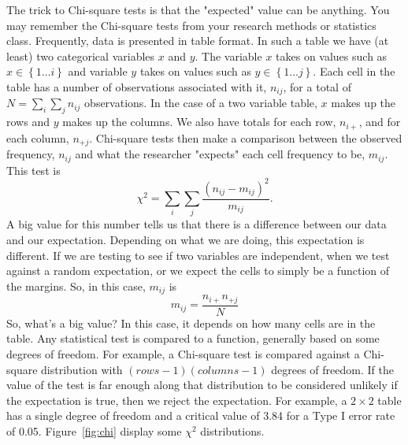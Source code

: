 The trick to Chi-square tests is that the "expected" value can be anything. You may remember the Chi-square tests from your research methods or statistics class. Frequently, data is presented in table format. In such a table we have (at least) two categorical variables $x$ and $y$. The variable $x$ takes on values such as $x\in\left\{1 \ldots i\right\}$ and variable $y$ takes on values such as $y\in\left\{1 \ldots j\right\}$. Each cell in the table has a number of observations associated with it, $n_{ij}$, for a total of $N=\sum_i\sum_jn_{ij}$ observations. In the case of a two variable table, $x$ makes up the rows and $y$ makes up the columns. We also have totals for each row, $n_{i+}$, and for each column, $n_{+j}$. Chi-square tests then make a comparison between the observed frequency, $n_{ij}$ and what the researcher "expects" each cell frequency to be, $m_{ij}$. This test is
\begin{equation}
\chi^2=\sum_i{\sum_j{\frac{\left(n_{ij}-m_{ij}\right)^2}{m_{ij}}}}.
\end{equation}
A big value for this number tells us that there is a difference between our data and our expectation. Depending on what we are doing, this expectation is different. If we are testing to see if two variables are independent, when we test against a random expectation, or we expect the cells to simply be a function of the margins. So, in this case, $m_{ij}$ is
\begin{equation}
m_{ij}=\frac{n_{i+}n_{+j}}{N}
\end{equation}
So, what's a big value? In this case, it depends on how many cells are in the table. Any statistical test is compared to a function, generally based on some degrees of freedom. For example, a Chi-square test is compared against a Chi-square distribution with $\left(rows-1\right)\left(columns-1\right)$ degrees of freedom. If the value of the test is far enough along that distribution to be considered unlikely if the expectation is true, then we reject the expectation. For example, a $2\times2$ table has a single degree of freedom and a critical value of 3.84 for a Type I error rate of 0.05. Figure~\ref{fig:chi} display some $\chi^2$ distributions.
